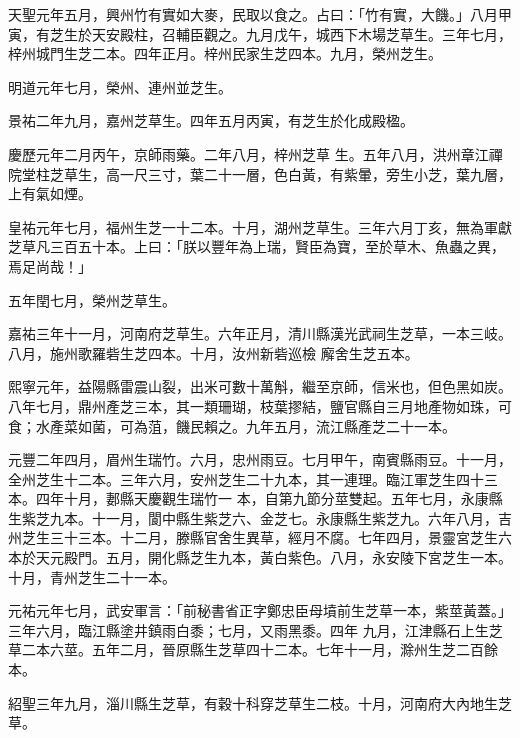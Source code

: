 \begin{pinyinscope}
 天聖元年五月，興州竹有實如大麥，民取以食之。占曰：「竹有實，大饑。」八月甲寅，有芝生於天安殿柱，召輔臣觀之。九月戊午，城西下木場芝草生。三年七月，梓州城門生芝二本。四年正月。梓州民家生芝四本。九月，榮州芝生。



 明道元年七月，榮州、連州並芝生。



 景祐二年九月，嘉州芝草生。四年五月丙寅，有芝生於化成殿楹。



 慶歷元年二月丙午，京師雨藥。二年八月，梓州芝草
 生。五年八月，洪州章江禪院堂柱芝草生，高一尺三寸，葉二十一層，色白黃，有紫暈，旁生小芝，葉九層，上有氣如煙。



 皇祐元年七月，福州生芝一十二本。十月，湖州芝草生。三年六月丁亥，無為軍獻芝草凡三百五十本。上曰：「朕以豐年為上瑞，賢臣為寶，至於草木、魚蟲之異，焉足尚哉！」



 五年閏七月，榮州芝草生。



 嘉祐三年十一月，河南府芝草生。六年正月，清川縣漢光武祠生芝草，一本三岐。八月，施州歌羅砦生芝四本。十月，汝州新砦巡檢
 廨舍生芝五本。



 熙寧元年，益陽縣雷震山裂，出米可數十萬斛，繼至京師，信米也，但色黑如炭。八年七月，鼎州產芝三本，其一類珊瑚，枝葉摎結，鹽官縣自三月地產物如珠，可食；水產菜如菌，可為菹，饑民賴之。九年五月，流江縣產芝二十一本。



 元豐二年四月，眉州生瑞竹。六月，忠州雨豆。七月甲午，南賓縣雨豆。十一月，全州芝生十二本。三年六月，安州芝生二十九本，其一連理。臨江軍芝生四十三本。四年十月，郪縣天慶觀生瑞竹一
 本，自第九節分莖雙起。五年七月，永康縣生紫芝九本。十一月，閬中縣生紫芝六、金芝七。永康縣生紫芝九。六年八月，吉州芝生三十三本。十二月，滕縣官舍生異草，經月不腐。七年四月，景靈宮芝生六本於天元殿門。五月，開化縣芝生九本，黃白紫色。八月，永安陵下宮芝生一本。十月，青州芝生二十一本。



 元祐元年七月，武安軍言：「前秘書省正字鄭忠臣母墳前生芝草一本，紫莖黃蓋。」三年六月，臨江縣塗井鎮雨白黍；七月，又雨黑黍。四年
 九月，江津縣石上生芝草二本六莖。五年二月，晉原縣生芝草四十二本。七年十一月，滁州生芝二百餘本。



 紹聖三年九月，淄川縣生芝草，有穀十科穿芝草生二枝。十月，河南府大內地生芝草。




\end{pinyinscope}
